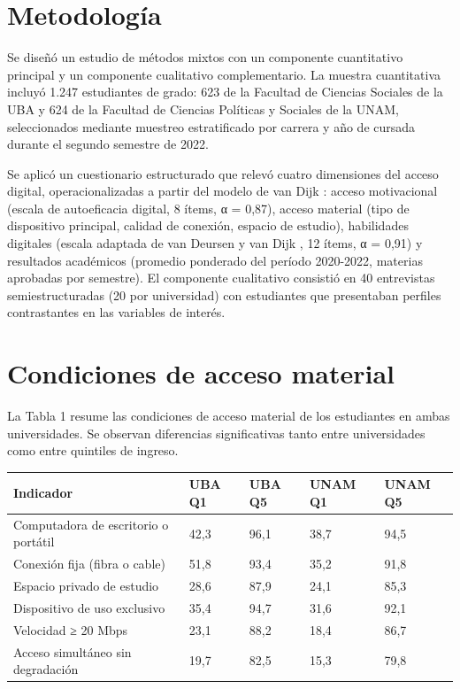 \documentclass{article}
\begin{document}
\section{Metodología}
Se diseñó un estudio de métodos mixtos con un componente cuantitativo principal y un componente cualitativo complementario. La muestra cuantitativa incluyó 1.247 estudiantes de grado: 623 de la Facultad de Ciencias Sociales de la UBA y 624 de la Facultad de Ciencias Políticas y Sociales de la UNAM, seleccionados mediante muestreo estratificado por carrera y año de cursada durante el segundo semestre de 2022.

Se aplicó un cuestionario estructurado que relevó cuatro dimensiones del acceso digital, operacionalizadas a partir del modelo de van Dijk \autocite{2563-VANDIJK2020}: acceso motivacional (escala de autoeficacia digital, 8 ítems, α = 0,87), acceso material (tipo de dispositivo principal, calidad de conexión, espacio de estudio), habilidades digitales (escala adaptada de van Deursen y van Dijk \autocite{2564-VANDEURSEN2019}, 12 ítems, α = 0,91) y resultados académicos (promedio ponderado del período 2020-2022, materias aprobadas por semestre). El componente cualitativo consistió en 40 entrevistas semiestructuradas (20 por universidad) con estudiantes que presentaban perfiles contrastantes en las variables de interés.


\section{Condiciones de acceso material}
La Tabla 1 resume las condiciones de acceso material de los estudiantes en ambas universidades. Se observan diferencias significativas tanto entre universidades como entre quintiles de ingreso.


\begin{table}[!ht]
\centering
{\sf\footnotesize\setlength\tabcolsep{4pt}%
  \begin{tabular}{@{}lllll@{}}
    \toprule
    \textbf{\textbf{Indicador}} & \textbf{\textbf{UBA Q1}} & \textbf{\textbf{UBA Q5}} & \textbf{\textbf{UNAM Q1}} & \textbf{\textbf{UNAM Q5}} \\
    \midrule
    Computadora de escritorio o portátil & 42,3 & 96,1 & 38,7 & 94,5 \\
    \midrule
    Conexión fija (fibra o cable) & 51,8 & 93,4 & 35,2 & 91,8 \\
    \midrule
    Espacio privado de estudio & 28,6 & 87,9 & 24,1 & 85,3 \\
    \midrule
    Dispositivo de uso exclusivo & 35,4 & 94,7 & 31,6 & 92,1 \\
    \midrule
    Velocidad ≥ 20 Mbps & 23,1 & 88,2 & 18,4 & 86,7 \\
    \midrule
    Acceso simultáneo sin degradación & 19,7 & 82,5 & 15,3 & 79,8 \\
    \bottomrule
  \end{tabular}
}%
\label{tbl-1}
\end{table}
\end{document}
